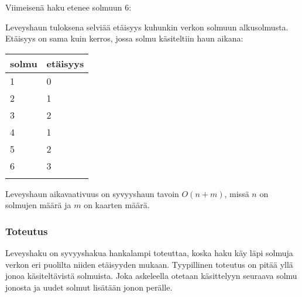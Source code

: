 Viimeisenä haku etenee solmuun 6:
\\
\begin{center}
\end{center}
Leveyshaun tuloksena selviää etäisyys
kuhunkin verkon solmuun alkusolmusta.
Etäisyys on sama kuin kerros,
jossa solmu käsiteltiin haun aikana:

\begin{tabular}{ll}
\\
solmu & etäisyys \\
\hline
1 & 0 \\
2 & 1 \\
3 & 2 \\
4 & 1 \\
5 & 2 \\
6 & 3 \\
\\
\end{tabular}

Leveyshaun aikavaativuus on syvyyshaun tavoin $O(n+m)$,
missä $n$ on solmujen määrä ja $m$ on kaarten määrä.

\subsubsection*{Toteutus}

Leveyshaku on syvyyshakua hankalampi toteuttaa,
koska haku käy läpi solmuja verkon eri
puolilta niiden etäisyyden mukaan.
Tyypillinen toteutus on pitää yllä jonoa
käsiteltävistä solmuista.
Joka askeleella otetaan käsittelyyn seuraava
solmu jonosta ja uudet solmut lisätään
jonon perälle.

